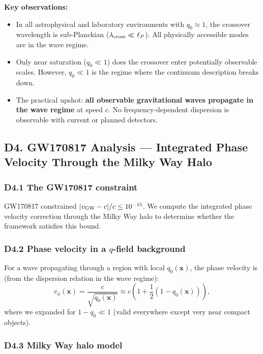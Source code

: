 \documentclass[reprint]{revtex4-2}
\begin{document}
\textbf{Key observations:}
\begin{itemize}
\item In all astrophysical and laboratory environments with $q_0\approx 1$, the crossover wavelength is sub-Planckian ($\lambda_{\rm cross} \ll \ell_P$). All physically accessible modes are in the wave regime.
\item Only near saturation ($q_0 \ll 1$) does the crossover enter potentially observable scales. However, $q_0 \ll 1$ is the regime where the continuum description breaks down.
\item The practical upshot: \textbf{all observable gravitational waves propagate in the wave regime} at speed $c$. No frequency-dependent dispersion is observable with current or planned detectors.
\end{itemize}

\subsection{D4. GW170817 Analysis --- Integrated Phase Velocity Through the Milky Way Halo}

\subsubsection{D4.1 The GW170817 constraint}

GW170817 constrained $|v_{\rm GW} - c|/c \le 10^{-15}$. We compute the integrated phase velocity correction through the Milky Way halo to determine whether the framework satisfies this bound.

\subsubsection{D4.2 Phase velocity in a $q$-field background}

For a wave propagating through a region with local $q_0(\mathbf{x})$, the phase velocity is (from the dispersion relation in the wave regime):
\begin{equation}
v_\phi(\mathbf{x}) = \frac{c}{\sqrt{q_0(\mathbf{x})}} \approx c\left(1 + \frac{1}{2}(1-q_0(\mathbf{x}))\right),
\end{equation}
where we expanded for $1-q_0 \ll 1$ (valid everywhere except very near compact objects).

\subsubsection{D4.3 Milky Way halo model}
\end{document}
